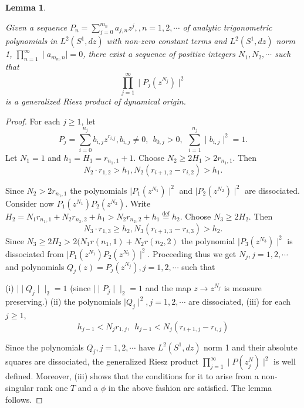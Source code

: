 \documentclass{amsart}
\newtheorem{lem}[Th]{Lemma}
\theoremstyle{definition}
\theoremstyle{remark}
\numberwithin{equation}{section}
\newcommand{\egdef}{\stackrel{\textrm {def}}{=}}
\newcommand{\1}{\mathbb{1}}
\begin{document}
 \begin{lem}\label{lem1}

Given a sequence $P_n = \sum_{j=0}^{m_n} a_{j, n}z^j, , n=1,2,\cdots$ of analytic trigonometric polynomials in $L^2(S^1,dz)$ with non-zero constant terms and $L^2(S^1,dz)$ norm 1, $\prod_{n=1}^\infty \mid a_{m_n, n}\mid =0$, there exist a sequence of positive integers $N_1, N_2, \cdots$ such that
$$\prod_{j=1}^\infty\mid P_j(z^{N_j})\mid^2$$
is a generalized Riesz product of dynamical origin.
\end{lem}
\begin{proof}
 For each $j\geq 1$, let
$$P_j = \sum_{i=0}^{n_j}b_{i,j}z^{r_{i,j}}, b_{i,j} \neq 0,  ~~b_{0, j} > 0, ~~\sum_{i=1}^{n_j} \mid b_{i,j}\mid^2 =1.$$
Let $N_1 =1$ and $h_1 = H_1 = r_{n_1,1}+1$. Choose $N_2 \geq 2H_1  > 2r_{n_1,1}$. Then
$${N_2\cdot r_{1,2}} > h_1, N_2(r_{i+1,2} - r_{i,2}) > h_1.$$

 Since $N_2 > 2r_{n_1,1}$ the   polynomials $\mid P_1(z^{N_1})\mid^2$ and $\mid P_2(z^{N_2})\mid^2$ are dissociated.
Consider now  $P_1(z^{N_1})P_2(z^{N_2})$. Write $H_2 = N_1r_{n_1,1} + N_2r_{n_2,2} +  h_1> N_2r_{n_2, 2} + h_1 \egdef   h_2 $.
Choose $N_3 \geq 2H_2$.
Then
$$N_3\cdot r_{1, 3} \geq h_2, N_3(r_{i+1, 3} -r_{i,3}) > h_2.$$
Since $N_3 \geq  2 H_2 > 2(N_1r(n_1,1) + N_2r(n_2,2)$ the polynomial $\mid P_3(z^{N_3})\mid^2$ is dissociated from $\mid P_1(z^{N_1})P_2(z^{N_2})\mid^2$.
Proceeding thus we get $N_j, j =1,2,\cdots$ and  polynomials  $Q_j(z) = P_j(z^{N_j}), j  =1,2,\cdots$ such that

(i) $\mid\mid Q_j \mid\mid_2 = 1$ (since $\mid\mid P_j\mid\mid_2 = 1$ and the map
$z \rightarrow z^{N_j}$ is measure preserving.)
(ii) the polynomials $\mid Q_j\mid^2, j =1,2,\cdots$ are dissociated,
(iii) for each $j\geq 1$,
$$h_{j-1} < N_{j}r_{1, j}, ~~h_{j-1} < N_{j}(r_{i+1,j} - r_{i, j}) $$

Since the polynomials $Q_j, j =1,2,\cdots$ have $L^2(S^1,dz)$ norm 1 and their absolute squares are dissociated, the generalized Riesz product $\prod_{j=1}^\infty\mid P(z^N_j)\mid^2$
is well defined. Moreover, (iii) shows that the conditions for it to arise  from a
non-singular rank one $T$ and a $\phi$ in the above fashion are satisfied. The lemma follows.
\end{proof}
\end{document}
